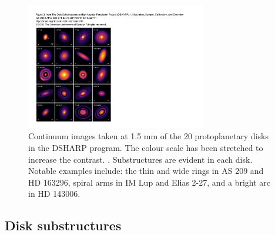 \begin{figure}
    \centering
    \includegraphics[width = 0.7\textwidth]{figures/DSHARP.pdf}
    \caption{Continuum images taken at 1.5 mm of the 20 protoplanetary disks in the DSHARP program. The colour scale has been stretched to increase the contrast. \citep{andrews2018}. Substructures are evident in each disk. Notable examples include: the thin and wide rings in AS 209 and HD 163296, spiral arms in IM Lup and Elias 2-27, and a bright arc in HD 143006.}
    \label{fig:DSHARP}
\end{figure}

\subsection{Disk substructures}

